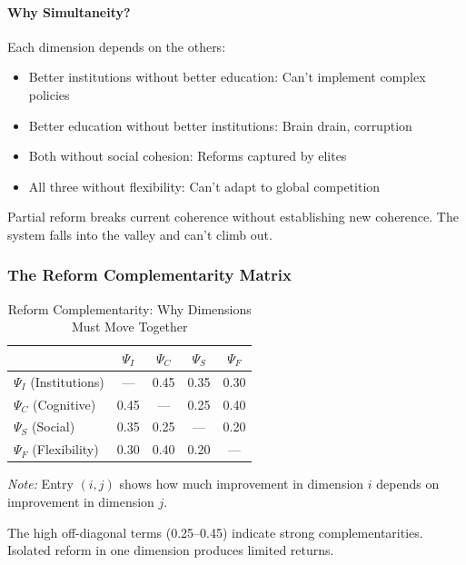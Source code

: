 \paragraph{Why Simultaneity?}
Each dimension depends on the others:
\begin{itemize}
    \item Better institutions without better education: Can't implement complex policies
    \item Better education without better institutions: Brain drain, corruption
    \item Both without social cohesion: Reforms captured by elites
    \item All three without flexibility: Can't adapt to global competition
\end{itemize}

Partial reform breaks current coherence without establishing new coherence.
The system falls into the valley and can't climb out.

\subsubsection{The Reform Complementarity Matrix}

\begin{table}[htbp]
\centering
\caption{Reform Complementarity: Why Dimensions Must Move Together}
\label{tab:reform-complementarity}
\small
\begin{tabular}{@{}lcccc@{}}
\toprule
& $\Psi_I$ & $\Psi_C$ & $\Psi_S$ & $\Psi_F$ \\
\midrule
$\Psi_I$ (Institutions) & --- & 0.45 & 0.35 & 0.30 \\
$\Psi_C$ (Cognitive) & 0.45 & --- & 0.25 & 0.40 \\
$\Psi_S$ (Social) & 0.35 & 0.25 & --- & 0.20 \\
$\Psi_F$ (Flexibility) & 0.30 & 0.40 & 0.20 & --- \\
\bottomrule
\end{tabular}
\begin{flushleft}
\small\textit{Note:} Entry $(i,j)$ shows how much improvement in dimension $i$ 
depends on improvement in dimension $j$.
\end{flushleft}
\end{table}

The high off-diagonal terms (0.25--0.45) indicate strong complementarities.
Isolated reform in one dimension produces limited returns.

